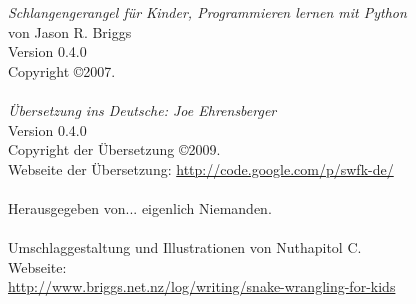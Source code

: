 \noindent
\textsf{\emph{Schlangengerangel für Kinder, Programmieren lernen mit Python}}\\
von Jason R. Briggs\\
Version 0.4.0
\\
Copyright \copyright 2007.\\
\\
\textsf{\emph{Übersetzung ins Deutsche: Joe Ehrensberger}}\\
Version 0.4.0\\
Copyright der Übersetzung \copyright 2009.\\
Webseite der Übersetzung: \href{http://code.google.com/p/swfk-de/}{http://code.google.com/p/swfk-de/}\\
\\
Herausgegeben von... eigenlich Niemanden.\\
\\
Umschlaggestaltung und Illustrationen von Nuthapitol C.\\
\linebreak 
\noindent
Webseite:\\ \href{http://www.briggs.net.nz/log/writing/snake-wrangling-for-kids}{http://www.briggs.net.nz/log/writing/snake-wrangling-for-kids}\\ 

